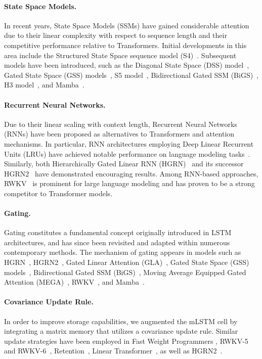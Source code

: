 \paragraph{State Space Models.} In recent years, State Space Models (SSMs) have gained considerable attention due to their linear complexity with respect to sequence length and their competitive performance relative to Transformers. Initial developments in this area include the Structured State Space sequence model (S4)~\citep{Gu:21}. Subsequent models have been introduced, such as the Diagonal State Space (DSS) model~\citep{Gupta:22}, Gated State Space (GSS) models~\citep{Mehta:22}, S5 model~\citep{Smith:22}, Bidirectional Gated SSM (BiGS)~\citep{Wang:22}, H3 model~\citep{Fu:23}, and Mamba~\citep{Gu:24arxiv}.

\paragraph{Recurrent Neural Networks.} Due to their linear scaling with context length, Recurrent Neural Networks (RNNs) have been proposed as alternatives to Transformers and attention mechanisms. In particular, RNN architectures employing Deep Linear Recurrent Units (LRUs) have achieved notable performance on language modeling tasks~\citep{Orvieto:23, De:24arxiv}. Similarly, both Hierarchically Gated Linear RNN (HGRN)~\citep{Qin:23} and its successor HGRN2~\citep{Qin:24arxiv} have demonstrated encouraging results. Among RNN-based approaches, RWKV~\citep{Peng:23arxivshort,Peng:24arxivshort} is prominent for large language modeling and has proven to be a strong competitor to Transformer models.

\paragraph{Gating.}
Gating constitutes a fundamental concept originally introduced in LSTM architectures, and has since been revisited and adapted within numerous contemporary methods. The mechanism of gating appears in models such as HGRN~\citep{Qin:23}, HGRN2~\citep{Qin:24arxiv}, Gated Linear Attention (GLA)~\citep{Yang:23arxiv}, Gated State Space (GSS) models~\citep{Mehta:22}, Bidirectional Gated SSM (BiGS)~\citep{Wang:22}, Moving Average Equipped Gated Attention (MEGA)~\citep{Ma:22}, RWKV~\citep{Peng:23arxivshort}, and Mamba~\citep{Gu:24arxiv}.

\paragraph{Covariance Update Rule.} In order to improve storage capabilities, we augmented the mLSTM cell by integrating a matrix memory that utilizes a covariance update rule. Similar update strategies have been employed in Fast Weight Programmers \citep{Schmidhuber:92ncfastweights,Schlag:21}, RWKV-5 and RWKV-6~\citep{Peng:24arxivshort}, Retention~\citep{Sun:23arxiv}, Linear Transformer~\citep{Katharopoulos:20}, as well as HGRN2~\citep{Qin:24arxiv}.

